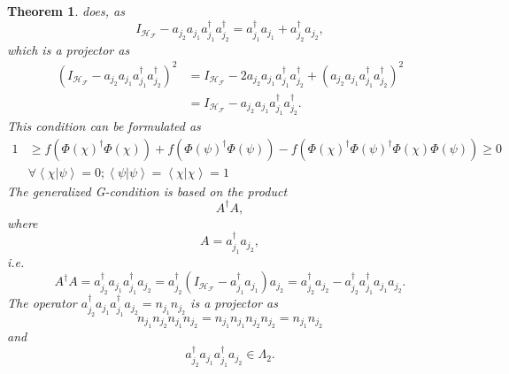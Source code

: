 \documentclass[aps,preprint]{revtex4}%
\newtheorem{theorem}{Theorem}
\begin{document}
\begin{theorem}
does, as
\begin{equation}
I_{\mathcal{H}_{\mathcal{F}}}-a_{j_{2}}a_{j_{1}}a_{j_{1}}^{\dagger}a_{j_{2}%
}^{\dagger}=a_{j_{1}}^{\dagger}a_{j_{1}}+a_{j_{2}}^{\dagger}a_{j_{2}},
\end{equation}
which is a projector as%
\begin{align}
\left(  I_{\mathcal{H}_{\mathcal{F}}}-a_{j_{2}}a_{j_{1}}a_{j_{1}}^{\dagger
}a_{j_{2}}^{\dagger}\right)  ^{2}  &  =I_{\mathcal{H}_{\mathcal{F}}}%
-2a_{j_{2}}a_{j_{1}}a_{j_{1}}^{\dagger}a_{j_{2}}^{\dagger}+\left(  a_{j_{2}%
}a_{j_{1}}a_{j_{1}}^{\dagger}a_{j_{2}}^{\dagger}\right)  ^{2}\nonumber\\
&  =I_{\mathcal{H}_{\mathcal{F}}}-a_{j_{2}}a_{j_{1}}a_{j_{1}}^{\dagger
}a_{j_{2}}^{\dagger}.
\end{align}
This condition can be formulated as
\begin{align}
1  &  \geq f\left(  \Phi\left(  \chi\right)  ^{\dagger}\Phi\left(
\chi\right)  \right)  +f\left(  \Phi\left(  \psi\right)  ^{\dagger}\Phi\left(
\psi\right)  \right)  -f\left(  \Phi\left(  \chi\right)  ^{\dagger}\Phi\left(
\psi\right)  ^{\dagger}\Phi\left(  \chi\right)  \Phi\left(  \psi\right)
\right)  \geq0\nonumber\\
&  \left.  \forall\right.  \left\langle \chi\left\vert \psi\right.
\right\rangle =0;\left\langle \psi\left\vert \psi\right.  \right\rangle
=\left\langle \chi\left\vert \chi\right.  \right\rangle =1
\end{align}
The generalized G-condition is based on the product
\begin{equation}
A^{\dagger}A,
\end{equation}
where
\begin{equation}
A=a_{j_{1}}^{\dagger}a_{j_{2}},
\end{equation}
i.e.%
\begin{equation}
A^{\dagger}A=a_{j_{2}}^{\dagger}a_{j_{1}}a_{j_{1}}^{\dagger}a_{j_{2}}%
=a_{j_{2}}^{\dagger}\left(  I_{\mathcal{H}_{\mathcal{F}}}-a_{j_{1}}^{\dagger
}a_{j_{1}}\right)  a_{j_{2}}=a_{j_{2}}^{\dagger}a_{j_{2}}-a_{j_{2}}^{\dagger
}a_{j_{1}}^{\dagger}a_{j_{1}}a_{j_{2}}.
\end{equation}
The operator $a_{j_{2}}^{\dagger}a_{j_{1}}a_{j_{1}}^{\dagger}a_{j_{2}%
}=n_{j_{1}}n_{j_{2}}$ is a projector as
\begin{equation}
n_{j_{1}}n_{j_{2}}n_{j_{1}}n_{j_{2}}=n_{j_{1}}n_{j_{1}}n_{j_{2}}n_{j_{2}%
}=n_{j_{1}}n_{j_{2}}%
\end{equation}
and
\begin{equation}
a_{j_{2}}^{\dagger}a_{j_{1}}a_{j_{1}}^{\dagger}a_{j_{2}}\in\Lambda_{2}.
\end{equation}

\end{theorem}
\end{document}
